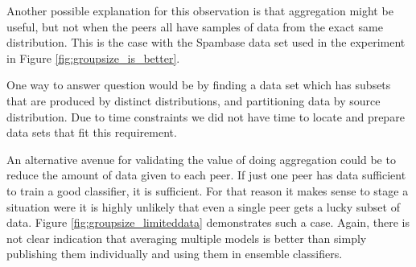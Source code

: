 Another possible explanation for this observation is that aggregation might be useful, but not when the peers all have samples of data from the exact same distribution. This is the case with the Spambase data set used in the experiment in Figure \ref{fig:groupsize_is_better}.

One way to answer question would be by finding a data set which has subsets that are produced by distinct distributions, and partitioning data by source distribution. Due to time constraints we did not have time to locate and prepare data sets that fit this requirement. 


An alternative avenue for validating the value of doing aggregation could be to reduce the amount of data given to each peer. If just one peer has data sufficient to train a good classifier, it is sufficient. For that reason it makes sense to stage a situation were it is highly unlikely that even a single peer gets a lucky subset of data. Figure \ref{fig:groupsize_limiteddata} demonstrates such a case. Again, there is not clear indication that averaging multiple models is better than simply publishing them individually and using them in ensemble classifiers.


%
%
%
%








\cleardoublepage